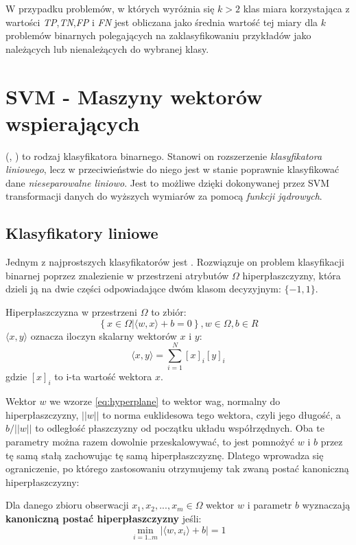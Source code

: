 	W przypadku problemów, w których wyróżnia się $ k>2 $ klas miara korzystająca z wartości  \emph{TP},\emph{TN},\emph{FP} i \emph{FN} jest obliczana jako średnia wartość tej miary dla $ k $ problemów binarnych polegających na zaklasyfikowaniu przykładów jako należących lub nienależących do wybranej klasy.


\section{SVM - Maszyny wektorów wspierających}
    
 (, ) to rodzaj klasyfikatora binarnego. Stanowi on rozszerzenie \emph{klasyfikatora liniowego}, lecz w przeciwieństwie do niego jest w stanie poprawnie klasyfikować dane \emph{nieseparowalne liniowo}. Jest to możliwe dzięki dokonywanej przez SVM transformacji danych do wyższych wymiarów za pomocą \emph{funkcji jądrowych}.

\subsection{Klasyfikatory liniowe}
Jednym z najprostszych klasyfikatorów jest . Rozwiązuje on problem klasyfikacji binarnej poprzez znalezienie w przestrzeni atrybutów $ \Omega $ hiperpłaszczyzny, która dzieli ją na dwie części odpowiadające dwóm klasom decyzyjnym: $ \{-1, 1 \} $.
\begin{definicjaa}
Hiperpłaszczyzna w przestrzeni $ \Omega $ to zbiór:
\begin{equation}
\left\{ x \in \Omega | \langle w, x\rangle + b = 0 \right\}, w \in \Omega, b \in R
\label{eq:hyperplane}
\end{equation}
$ \langle x, y \rangle $ oznacza iloczyn skalarny wektorów $ x $ i $ y $:
$$ \langle x, y \rangle = \sum_{i=1}^{N} [x]_i [y]_i $$
gdzie $ [x]_i $ to i-ta wartość wektora $ x $.
\end{definicjaa}

Wektor $ w $ we wzorze \ref{eq:hyperplane} to wektor wag, normalny do hiperpłaszczyzny, $ ||w|| $ to norma euklidesowa tego wektora, czyli jego długość, a $ b/||w|| $ to odległość płaszczyzny od początku układu współrzędnych.
Oba te parametry można razem dowolnie przeskalowywać, to jest pomnożyć $ w $ i $ b $ przez tę samą stałą zachowując tę samą hiperpłaszczyznę. Dlatego wprowadza się ograniczenie, po którego zastosowaniu otrzymujemy tak zwaną postać kanoniczną hiperpłaszczyzny:
\begin{definicjaa}
Dla danego zbioru obserwacji $ x_1, x_2, ..., x_m \in \Omega $ wektor $ w $ i parametr $ b $ wyznaczają \textbf{kanoniczną postać hiperpłaszczyzny} jeśli:
\begin{equation}
	\min_{i=1..m} | \langle w, x_i \rangle + b | = 1
\label{eq:canonical}
\end{equation}
\end{definicjaa}


